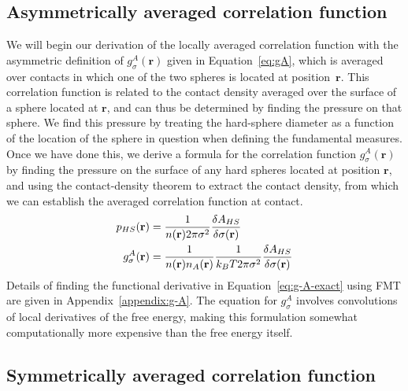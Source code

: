 \documentclass[letterpaper,twocolumn,amsmath,amssymb,jcp,10pt,aip]{revtex4-1}
\newcommand{\rr}{\textbf{r}}
\newcommand{\derivation}[1]{} %
\begin{document}
\subsection{Asymmetrically averaged correlation function}\label{sec:g-A}

We will begin our derivation of the locally averaged correlation
function with the asymmetric definition of $g_\sigma^A(\rr)$ given in
Equation~\ref{eq:gA}, which is averaged over contacts in which one of
the two spheres is located at position~$\rr$.  This correlation
function is related to the contact density averaged over the surface
of a sphere located at $\rr$, and can thus be determined by finding
the pressure on that sphere.  We find this pressure by treating the
hard-sphere diameter as a function of the location of the sphere in
question when defining the fundamental measures.  Once we have done this, we derive a formula for the correlation
function $g_\sigma^A(\rr)$ by finding the pressure on the surface of
any hard spheres located at position $\rr$, and using the
contact-density theorem to extract the contact density, from which we
can establish the averaged correlation function at contact.
\begin{align}
  p_{HS}(\mathbf{r}) &= \frac{1}{n(\rr) 2\pi \sigma^2} \frac{\delta
    A_{HS}}{\delta \sigma(\mathbf{r})} \label{eq:p_{HS}^A}\\
  g_\sigma^A(\rr)%
  &= \frac{1}{n(\rr) n_A(\rr)}\frac{1}{ k_BT 2\pi \sigma^2} \frac{\delta
    A_{HS}}{\delta \sigma(\mathbf{r})} \label{eq:g-A-exact}
\end{align}
Details of finding the functional derivative in
Equation~\ref{eq:g-A-exact} using FMT are given in
Appendix~\ref{appendix:g-A}.  The equation for $g_\sigma^A$ involves
convolutions of local derivatives of the free energy, making this
formulation somewhat computationally more expensive than the free
energy itself.

\derivation{
  \end{widetext}
}

\subsection{Symmetrically averaged correlation function}\label{sec:g-S}
\end{document}

